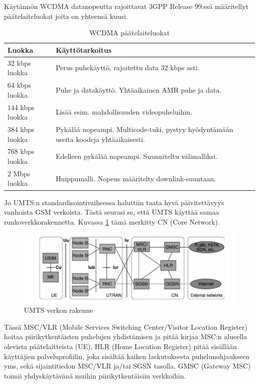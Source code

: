 \documentclass[11pt,a4paper,oneside,article,finnish]{memoir}
\begin{document}
Käytännön WCDMA datanopeutta rajoittavat 3GPP Release 99:ssä määritellyt päätelaiteluokat joita on yhteensä kuusi. 
\begin{table}[H]
	\centering
	\caption{WCDMA päätelaiteluokat}
	\begin{tabularx}{.95\textwidth}{|X|X|}
		\hline
		Luokka & Käyttötarkoitus \\
    		\hline
		32 kbps luokka & Perus puhekäyttö, rajoitettu data 32 kbps asti. \\
    		\hline
		64 kbps luokka & Puhe ja datakäyttö. Yhtäaikainen AMR puhe ja data. \\
    		\hline
		144 kbps luokka & Lisää esim. mahdollisuuden videopuheluihin. \\
    		\hline
		384 kbps luokka & Pykälää nopeampi. Multicode-tuki, pystyy hyödyntämään useita koodeja yhtäaikaisesti.  \\
    		\hline
		768 kbps luokka & Edelleen pykälää nopeampi. Suunniteltu välimalliksi. \\
    		\hline
		2 Mbps luokka & Huippumalli. Nopeus määritelty downlink-suuntaan. \\
		\hline
	\end{tabularx}
	\label{table:wcdmapaatelaiteluokat}
\end{table}
Jo UMTS:n standardisointivaiheessa haluttiin taata hyvä päivitettävyys vanhoista GSM verkoista. Tästä seurasi se, että UMTS käyttää samaa runkoverkkorakennetta. Kuvassa \ref{fig:umtscore} tämä merkitty CN (Core Network).
\begin{figure}[H]
	\centering
	\includegraphics{umtscore}
	\caption{UMTS verkon rakenne}
	\label{fig:umtscore}
\end{figure}
Tässä MSC/VLR (Mobile Services Switching Center/Visitor Location Register) hoitaa piirikytkentäisten puhelujen yhdistämisen ja pitää kirjaa MSC:n alueella olevista päätelaitteista (UE). HLR (Home Location Register) pitää sisällään käyttäjien palveluprofiilin, joka sisältää kaiken laskutuksesta puhelunohjaukseen yms, sekä sijaintitiedon MSC/VLR ja/tai SGSN tasolla. GMSC (Gateway MSC) toimii yhdyskäytävänä muihin piirikytkentäisiin verkkoihin. 
\end{document}
